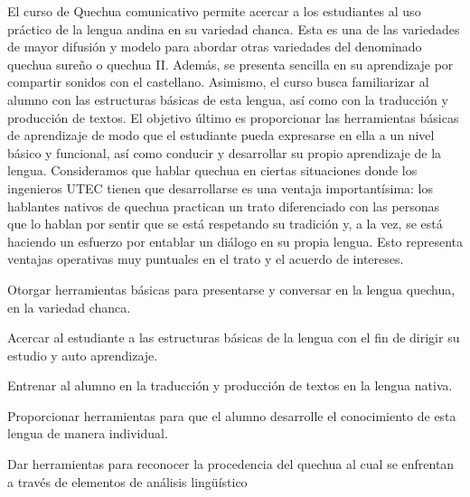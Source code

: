 \begin{syllabus}


\begin{justification}
El curso de Quechua comunicativo permite acercar a los estudiantes al uso práctico de la lengua andina en su variedad chanca. Esta es una de las variedades de mayor difusión y modelo para abordar otras variedades del denominado quechua sureño o quechua II. Además, se presenta sencilla en su aprendizaje por compartir sonidos con el castellano. Asimismo, el curso busca familiarizar al alumno con las estructuras básicas de esta lengua, así como con la traducción y producción de textos. El objetivo último es proporcionar las herramientas básicas de aprendizaje de modo que el estudiante pueda expresarse en ella a un nivel básico y funcional, así como conducir y desarrollar su propio aprendizaje de la lengua.
Consideramos que hablar quechua en ciertas situaciones donde los ingenieros UTEC tienen que desarrollarse es una ventaja importantísima: los hablantes nativos de quechua practican un trato diferenciado con las personas que lo hablan por sentir que se está respetando su tradición y, a la vez, se está haciendo un esfuerzo por entablar un diálogo en su propia lengua. Esto representa ventajas operativas muy puntuales en el trato y el acuerdo de intereses. 
\end{justification}

\begin{goals}
\item Otorgar herramientas básicas para presentarse y conversar en la lengua quechua, en la variedad chanca.
\item Acercar al estudiante a las estructuras básicas de la lengua con el fin de dirigir su estudio y auto aprendizaje.
\item Entrenar al alumno en la traducción y producción de textos en la lengua nativa.
\item Proporcionar herramientas para que el alumno desarrolle el conocimiento de esta lengua de manera individual.
\item Dar herramientas para reconocer la procedencia del quechua al cual se enfrentan a través de elementos de análisis lingüístico
\end{goals}

\begin{outcomes}
    \item {} %
    \item {} %
    \item {} %
    \item {} %
    \item {} %
\end{outcomes}


\end{syllabus}
